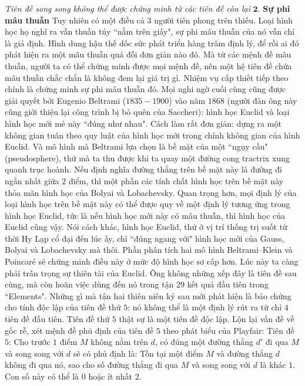 \begin{multicols}{2}
	\vskip 0.1cm
	\textit{Tiên đề song song không thể được chứng minh từ các tiên đề còn lại} 
	\vskip 0.1cm
	$\pmb{2.}$ \textbf{\color{lichsutoanhoc}Sự phi mâu thuẫn}
	\vskip 0.1cm
	Tuy nhiên có một điều cả $3$ người tiên phong trên thiếu. Loại hình học họ nghĩ ra vẫn thuần túy ``nằm trên giấy", sự phi mâu thuẫn của nó vẫn chỉ là giả định. Hình dung hậu thế dốc sức phát triển hàng trăm định lý, để rồi ai đó phát hiện ra một mâu thuẫn quá đỗi đơn giản nào đó. Mà từ các mệnh đề mâu thuẫn, người ta có thể chứng minh được mọi mệnh đề, nên một hệ tiên đề chứa mâu thuẫn chắc chắn là không đem lại giá trị gì. Nhiệm vụ cấp thiết tiếp theo chính là chứng minh sự phi mâu thuẫn đó.
	\vskip 0.1cm
	Mọi nghi ngờ cuối cùng cũng được giải quyết bởi Eugenio Beltrami ($1835-1900$) vào năm $1868$ (người đàn ông này cũng giới thiệu lại công trình bị bỏ quên của Saccheri): hình học Euclid và loại hình học mới mẻ này ``đúng như nhau". 
	\vskip 0.1cm
	Cách làm rất đơn giản: dựng ra một không gian tuân theo quy luật của hình học mới trong chính không gian của hình Euclid. Và mô hình mà Beltrami lựa chọn là bề mặt của một ``ngụy cầu" (pseudosphere), thứ mà ta thu được khi ta quay một đường cong tractrix xung quanh trục hoành. Nếu định nghĩa đường thẳng trên bề mặt này là đường đi ngắn nhất giữa $2$ điểm, thì một phần các tính chất hình học trên bề mặt này thỏa mãn hình học của Bolyai và Lobachevsky. 
	\vskip 0.1cm
	Quan trọng hơn, mọi định lý của loại hình học trên bề mặt này có thể được quy về một định lý tương ứng trong hình học Euclid, tức là nếu hình học mới này có mâu thuẫn, thì hình học của Euclid cũng vậy. Nói cách khác, hình học Euclid, thứ ở vị trí thống trị suốt từ thời Hy Lạp cổ đại đến lúc ấy, chỉ ``đúng ngang với" hình học mới của Gauss, Bolyai và Lobachevsky mà thôi. Phần phân tích hai mô hình Beltrami--Klein và Poincaré sẽ chứng minh điều này ở mức độ hình học sơ cấp hơn.
	\vskip 0.1cm
	Lúc này ta càng phải trân trọng sự thiên tài của Euclid. Ông không những xếp đây là tiên đề sau cùng, mà còn hoãn việc dùng đến nó trong tận $29$ kết quả đầu tiên trong ``Elements". Những gì mà tận hai thiên niên kỷ sau mới phát hiện là bảo chứng cho tính độc lập của tiên đề thứ $5$: nó không thể là một định lý rút ra từ chỉ $4$ tiên đề đầu tiên. Tiên đề thứ $5$ thật sự là một tiên đề độc lập.
	\vskip 0.1cm
	Lộn lại vấn đề về gốc rễ, xét mệnh đề phủ định của tiên đề $5$ theo phát biểu của Playfair:
	\vskip 0.1cm
	Tiên đề $5$: Cho trước $1$ điểm $M$ không nằm trên $d$, có đúng một đường thẳng $d'$ đi qua $M$ và song song với $d$
	\vskip 0.1cm
	sẽ có phủ định là: 
	\vskip 0.1cm
	Tồn tại một điểm $M$ và đường thẳng $d$ không đi qua nó, sao cho số đường thẳng đi qua $M$ và song song với $d$ là khác $1$. Con số này có thể là $0$ hoặc ít nhất $2$. 

\end{multicols}
